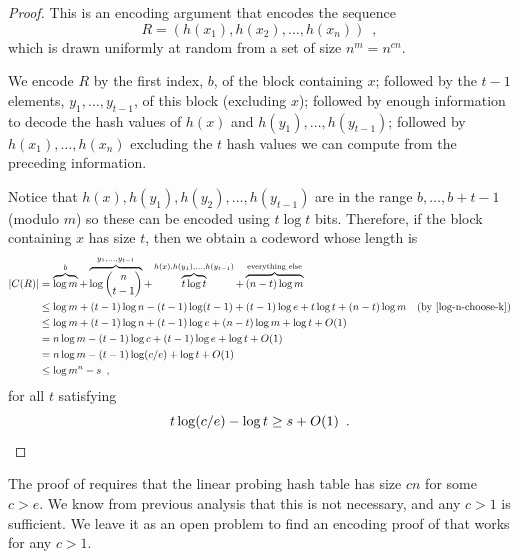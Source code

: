 \documentclass{patmorin}
\begin{document}
\begin{proof}
  This is an encoding argument that encodes the sequence
  \[
  R = (h(x_1),h(x_2),\ldots,h(x_n)) \enspace ,
  \]
  which is drawn uniformly at random from a set of size
  $n^{m}=n^{cn}$.
  
  We encode $R$ by the first index, $b$, of the block containing $x$;
  followed by the $t-1$ elements, $y_1,\ldots,y_{t-1}$, of this block
  (excluding $x$); followed by enough information to decode the hash
  values of $h(x)$ and $h(y_1),\ldots,h(y_{t-1})$; followed by
  $h(x_1),\ldots,h(x_n)$ excluding the $t$ hash values we can compute
  from the preceding information.

  Notice that $h(x),h(y_1),h(y_2),\ldots,h(y_{t-1})$ are in the range
  $b,\ldots,b+t-1$ (modulo $m$) so these can be encoded using $t\log
  t$ bits.  Therefore, if the block containing $x$ has size $t$, then
  we obtain a codeword whose length is
  \begin{align*}
    |C(R)| & = \overbrace{\log m}^{b} + \overbrace{\log\binom{n}{t-1}}^{y_1,\ldots,y_{t-1}} + \overbrace{t\log t}^{h(x),h(y_1),\ldots,h(y_{t-1})} + \overbrace{(n-t)\log m}^{\text{everything else}} \\
           & \le \log m + (t-1)\log n - 
             (t-1)\log(t-1) + (t-1)\log e + t\log t + (n-t)\log m & \text{(by \eqref{log-n-choose-k})}\\
           & \le \log m + (t-1)\log n + (t-1)\log e + (n-t)\log m + \log t+ O(1)\\
           & = n\log m - (t-1)\log c + (t-1)\log e + \log t + O(1) \\
           & = n\log m - (t-1)\log(c/e) + \log t + O(1) \\
           & \le \log m^n - s \enspace ,
  \end{align*}
  for all $t$ satisfying
  \[t \log (c/e) - \log t \ge s + O(1) \enspace . \qedhere\]
\end{proof}

\begin{rem}
  The proof of  requires that the linear
  probing hash table has size $cn$ for some $c>e$.  We know from
  previous analysis that this is not necessary, and any $c>1$ is
  sufficient. We leave it as an open problem to find an encoding proof
  of  that works for any $c>1$.
\end{rem}
\end{document}
